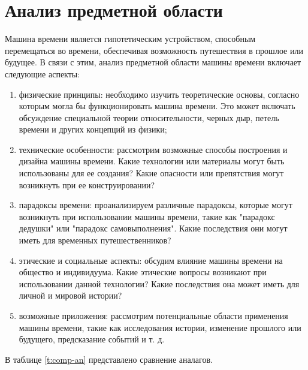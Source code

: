 
\section{Анализ предметной области}

Машина времени является гипотетическим устройством, способным перемещаться во времени, обеспечивая возможность путешествия в прошлое или будущее. В связи с этим, анализ предметной области машины времени включает следующие аспекты:


\begin{enumerate}
	\item физические принципы: необходимо изучить теоретические основы, согласно которым могла бы функционировать машина времени. Это может включать обсуждение специальной теории относительности, черных дыр, петель времени и других концепций из физики;

	\item технические особенности: рассмотрим возможные способы построения и дизайна машины времени. Какие технологии или материалы могут быть использованы для ее создания? Какие опасности или препятствия могут возникнуть при ее конструировании?

	\item парадоксы времени: проанализируем различные парадоксы, которые могут возникнуть при использовании машины времени, такие как "парадокс дедушки" или "парадокс самовыполнения". Какие последствия они могут иметь для временных путешественников?

	\item этические и социальные аспекты: обсудим влияние машины времени на общество и индивидуума. Какие этические вопросы возникают при использовании данной технологии? Какие последствия она может иметь для личной и мировой истории?

	\item возможные приложения: рассмотрим потенциальные области применения машины времени, такие как исследования истории, изменение прошлого или будущего, предсказание событий и т. д.
\end{enumerate}

В таблице \ref{t:comp-an} представлено сравнение аналагов.

